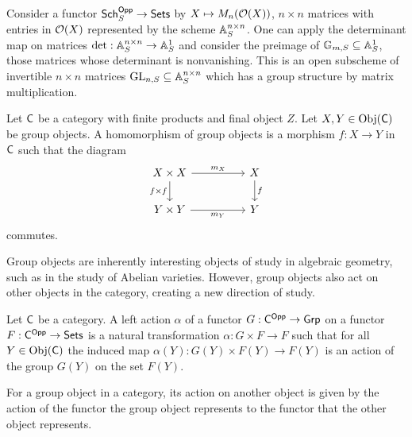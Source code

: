 \begin{example}
    Consider a functor $\mathsf{Sch}_{S}^{\mathsf{Opp}}\to\mathsf{Sets}$ by $X\mapsto M_{n}(\mathcal{O}(X))$, $n\times n$ matrices with entries in $\mathcal{O}(X)$ represented by the scheme $\mathbb{A}^{n\times n}_{S}$. One can apply the determinant map on matrices $\det:\mathbb{A}^{n\times n}_{S}\to \mathbb{A}^{1}_{S}$ and consider the preimage of $\mathbb{G}_{m,S}\subseteq\mathbb{A}^{1}_{S}$, those matrices whose determinant is nonvanishing. This is an open subscheme of invertible $n\times n$ matrices $\mathrm{GL}_{n,S}\subseteq\mathbb{A}^{n\times n}_{S}$ which has a group structure by matrix multiplication. 
\end{example}
\begin{definition}\label{def: group object homomorphism}
    Let $\mathsf{C}$ be a category with finite products and final object $Z$. Let $X,Y\in\mathrm{Obj}(\mathsf{C})$ be group objects. A homomorphism of group objects is a morphism $f:X\to Y$ in $\mathsf{C}$ such that the diagram 
    $$%
    \begin{tikzcd}
        {X\times X} && X \\
        {Y\times Y} && Y
        \arrow["{f\times f}"', from=1-1, to=2-1]
        \arrow["{m_{Y}}"', from=2-1, to=2-3]
        \arrow["{m_{X}}", from=1-1, to=1-3]
        \arrow["f", from=1-3, to=2-3]
    \end{tikzcd}$$
    commutes. 
\end{definition}
Group objects are inherently interesting objects of study in algebraic geometry, such as in the study of Abelian varieties. However, group objects also act on other objects in the category, creating a new direction of study. 
\begin{definition}\label{def: action of group object}
    Let $\mathsf{C}$ be a category. A left action $\alpha$ of a functor $G:\mathsf{C}^{\mathsf{Opp}}\to\mathsf{Grp}$ on a functor $F:\mathsf{C}^{\mathsf{Opp}}\to\mathsf{Sets}$ is a natural transformation $\alpha:G\times F\to F$ such that for all $Y\in\mathrm{Obj}(\mathsf{C})$ the induced map $\alpha(Y):G(Y)\times F(Y)\to F(Y)$ is an action of the group $G(Y)$ on the set $F(Y)$. 
\end{definition}
For a group object in a category, its action on another object is given by the action of the functor the group object represents to the functor that the other object represents. 
